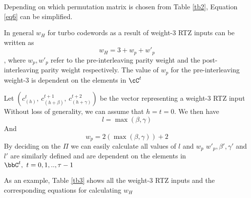 \documentclass[11pt, oneside, dvipdfmx]{book}
\begin{document}
Depending on which permutation matrix is chosen from Table \ref{tb2}, Equation \ref{eq6} can be simplified. 

In general $w_H$ for turbo codewords as a result of weight-$3$ RTZ inputs can be written as $$w_H=3 + w_p+ w'_p$$, where $w_p,w'_p$ refer to the pre-interleaving parity weight and the post-interleaving parity weight respectively. The value of $w_p$ for the pre-interleaving weight-$3$ is dependent on the elements in $\cC^t$

Let $(c_{(h)}^{t},~c_{(h+\beta)}^{t+1},~c_{(h+\gamma)}^{t+2})$ be the vector representing a weight-$3$ RTZ input
Without loss of generality, we can assume that $h =t =0$. We then have 
\begin{equation}
l=\max{(\beta,\gamma)}
\label{eq8}
\end{equation}
And 
\begin{equation}
w_p=
2(\max{(\beta,\gamma)})+2
\label{eq9}
\end{equation}
By deciding on the $\Pi$ we can easily calculate all values of $l$ and $w_p$
$w'_p,\beta',\gamma' $ and $l'$ are similarly defined and are dependent on the elements in $\bbC^{t},~t=0,1,..,\tau-1$

As an example, Table \ref{tb3} shows all the weight-$3$ RTZ inputs and the corresponding equations for calculating $w_H$
\end{document}
